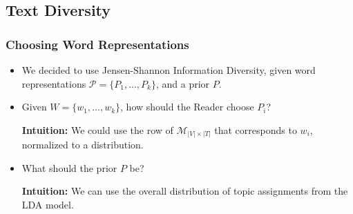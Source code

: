 \documentclass{beamer}
\newcommand\bet{\begin{Theorem}}
\newcommand\eet{\end{Theorem}}
\newcommand\bed{\begin{Definition}}
\newcommand\eed{\end{Definition}}
\newcommand\cP{{\mathcal P}}
\newcommand\cM{{\mathcal M}}
\begin{document}


\subsection{Text Diversity}

\begin{frame}
\frametitle{Choosing Word Representations}
\begin{itemize}
\item We decided to use Jensen-Shannon Information Diversity, given
  word representations $\cP=\{P_1,...,P_k\}$, and a prior $P$.
\item Given $W=\{w_1,...,w_k\}$, how should the Reader choose $P_{i}$?

{\bf Intuition:} We could use the row of $\cM_{|V|\times|T|}$ that
corresponds to $w_i$, normalized to a distribution.
\item What should the prior $P$ be?

{\bf Intuition:} We can use the overall distribution of topic
assignments from the LDA model.
\end{itemize}
\end{frame}
\end{document}
